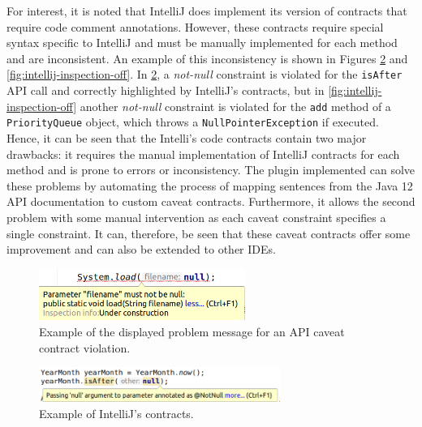 For interest, it is noted that IntelliJ does implement its version of contracts that require code comment annotations. However, these contracts require special syntax specific to IntelliJ and must be manually implemented for each method and are inconsistent. An example of this inconsistency is shown in Figures \ref{fig:intellij-inspection-on} and \ref{fig:intellij-inspection-off}. In \ref{fig:intellij-inspection-on}, a \textit{not-null} constraint is violated for the \lstinline{isAfter} API call and correctly highlighted by IntelliJ's contracts, but in \ref{fig:intellij-inspection-off} another \textit{not-null} constraint is violated for the \lstinline{add} method of a \lstinline{PriorityQueue} object, which throws a \lstinline{NullPointerException} if executed. Hence, it can be seen that the Intelli's code contracts contain two major drawbacks: it requires the manual implementation of IntelliJ contracts for each method and is prone to errors or inconsistency. The plugin implemented can solve these problems by automating the process of mapping sentences from the Java 12 API documentation to custom caveat contracts. Furthermore, it allows the second problem with some manual intervention as each caveat constraint specifies a single constraint. It can, therefore, be seen that these caveat contracts offer some improvement and can also be extended to other IDEs.

\begin{figure}[h]
	\label{fig:plugin-problem}
	\centering
	\includegraphics[width=0.6\textwidth]{figs/plugin-problem.png}
	\caption{Example of the displayed problem message for an API caveat contract violation.}
\end{figure}

\begin{figure}[h]
	\label{fig:intellij-inspection-on}
	\centering
	\includegraphics[width=0.7\textwidth]{figs/intellij-inspection-on.png}
	\caption{Example of IntelliJ's contracts.}
\end{figure}

